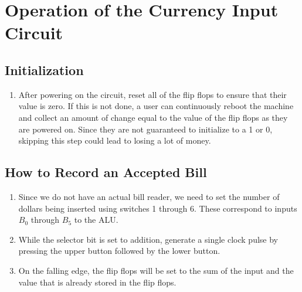 \section{Operation of the Currency Input Circuit}

\subsection{Initialization}
\begin{enumerate}
\item After powering on the circuit, reset all of the flip flops to ensure that their value is zero. If this is not done, a user can continuously reboot the machine and collect an amount of change equal to the value of the flip flops as they are powered on. Since they are not guaranteed to initialize to a 1 or 0, skipping this step could lead to losing a lot of money. 
\end{enumerate}

\subsection{How to Record an Accepted Bill}
\begin{enumerate}
\item Since we do not have an actual bill reader, we need to set the number of dollars being inserted using switches 1 through 6. These correspond to inputs $B_0$ through $B_5$ to the ALU.
\item While the selector bit is set to addition, generate a single clock pulse by pressing the upper button followed by the lower button.
\item On the falling edge, the flip flops will be set to the sum of the input and the value that is already stored in the flip flops. 
\end{enumerate}
